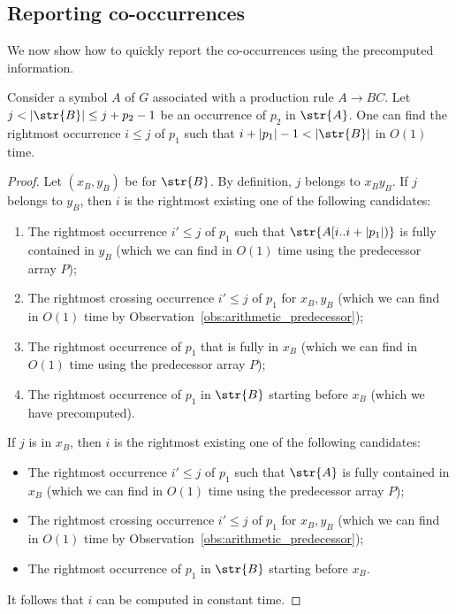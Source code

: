 \subsection{Reporting co-occurrences}
We now show how to quickly report the co-occurrences using the precomputed information. 

\begin{proposition}\label{claim:predecessor_of_crossing}
Consider a symbol $A$ of $G$ associated with a production rule $A \rightarrow BC$. Let $j < |\str{B}| \le j+p_2-1$ be an occurrence of $p_2$ in $\str{A}$. One can find the rightmost occurrence $i \le j$ of $p_1$ such that $i+|p_1|-1 < |\str{B}|$ in $O(1)$ time.  
\end{proposition}
\begin{proof}
Let $(x_B, y_B)$ be  for $\str{B}$. By definition, $j$ belongs to $x_By_B$. If $j$ belongs to $y_B$, then $i$ is the rightmost existing one of the following candidates:
\begin{enumerate}
    \item The rightmost occurrence $i' \le j$ of $p_1$ such that $\str{A[i..i+|p_1|)}$ is fully contained in $y_B$ (which we can find in $O(1)$ time using the predecessor array $P$); 
    \item The rightmost crossing occurrence $i' \le j$ of $p_1$ for $x_B, y_B$ (which we can find in $O(1)$ time by Observation~\ref{obs:arithmetic_predecessor});
    \item The rightmost occurrence of $p_1$ that is fully in $x_B$ (which we can find in $O(1)$ time using the predecessor array $P$); 
    \item The rightmost occurrence of $p_1$ in $\str{B}$ starting before $x_B$ (which we have precomputed). 
\end{enumerate}
If $j$ is in $x_B$, then $i$ is the rightmost existing one of the following candidates:
     \begin{itemize}
         \item The rightmost occurrence $i' \le j$ of $p_1$ such that $\str{A}$ is fully contained in $x_B$ (which we can find in $O(1)$ time using the predecessor array $P$);
         \item The rightmost crossing occurrence $i' \le j$ of $p_1$ for $x_B, y_B$ (which we can find in $O(1)$ time by Observation~\ref{obs:arithmetic_predecessor});
         \item The rightmost occurrence of $p_1$ in $\str{B}$ starting before $x_B$. 
     \end{itemize}
It follows that $i$ can be computed in constant time.
 
\end{proof}

